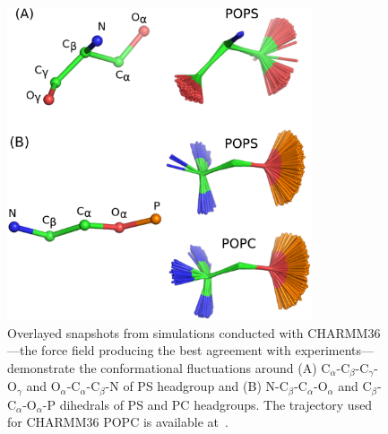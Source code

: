 \documentclass[aps,prl,superscriptaddress,twocolumn]{revtex4}
\begin{document}
\begin{figure}[]
  \centering
  \includegraphics[width=9.0cm]{../Figs/structures.eps}
  \caption{\label{HGstructuresPSandPC}
    Overlayed snapshots from simulations conducted with CHARMM36---the force field producing the best agreement with experiments---demonstrate the conformational fluctuations around
    (A) C$_\alpha$-C$_\beta$-C$_\gamma$-O$_\gamma$ and  O$_\alpha$-C$_\alpha$-C$_\beta$-N
    of PS headgroup and (B) N-C$_\beta$-C$_\alpha$-O$_\alpha$ and C$_\beta$-C$_\alpha$-O$_\alpha$-P
    dihedrals of PS and PC headgroups. The trajectory used for CHARMM36 POPC is available at~.
  }

\end{figure}
\end{document}
